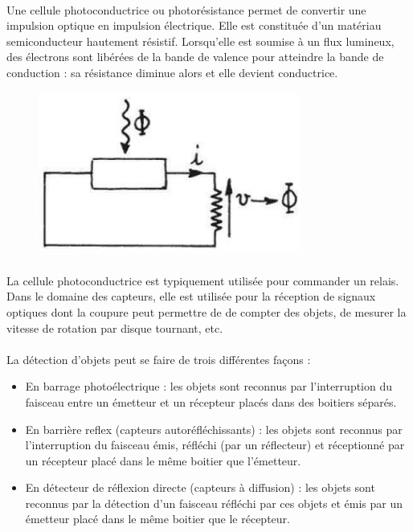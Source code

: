 \documentclass{article}
\begin{document}
    \paragraph{}
    Une cellule photoconductrice ou photorésistance permet de convertir une impulsion optique en impulsion électrique. Elle est constituée d'un matériau semiconducteur hautement résistif. Lorsqu'elle est soumise à un flux lumineux, des électrons sont libérées de la bande de valence pour atteindre la bande de conduction : sa résistance diminue alors et elle devient conductrice. 

    \begin{figure}[H]
        \centering
        \includegraphics[width=0.3\linewidth]{./images/photoelec.png}
    \end{figure}

    \paragraph{}
    La cellule photoconductrice est typiquement utilisée pour commander un relais. Dans le domaine des capteurs, elle est utilisée pour la réception de signaux optiques dont la coupure peut permettre de de compter des objets, de mesurer la vitesse de rotation par disque tournant, etc.
    
    \paragraph{}
    La détection d'objets peut se faire de trois différentes façons :
    \begin{itemize}
        \item En barrage photoélectrique : les objets sont reconnus par l'interruption du faisceau entre un émetteur et un récepteur placés dans des boitiers séparés.
        \item En barrière reflex (capteurs autoréfléchissants) : les objets sont reconnus par l'interruption du faisceau émis, réfléchi (par un réflecteur) et réceptionné par un récepteur placé dans le même boitier que l'émetteur.
        \item En détecteur de réflexion directe (capteurs à diffusion) : les objets sont reconnus par la détection d'un faisceau réfléchi par ces objets et émis par un émetteur placé dans le même boitier que le récepteur. 
    \end{itemize}
\end{document}
